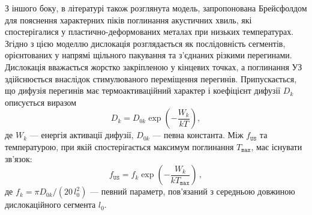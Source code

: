 З іншого боку, в літературі \cite{Brailsford} також розглянута модель, запропонована Брейсфолдом для пояснення характерних піків поглинання акустичних хвиль, які спостерігалися у пластично-деформованих металах при низьких температурах.
Згідно з цією моделлю дислокація розглядається як послідовність сегментів, орієнтованих у напрямі щільного пакування та з'єднаних різкими перегинами.
Дислокація вважається жорстко закріпленою у кінцевих точках, а поглинання УЗ здійснюється внаслідок стимулюваного переміщення перегинів.
Припускається, що дифузія перегинів має термоактиваційний характер і коефіцієнт дифузії $D_k$ описується виразом
\begin{equation}\label{eqDkink}
  D_k = D_{0k} \exp\left(-\frac{W_k}{kT}\right),
\end{equation}
де $W_k$ --- енергія активації дифузії,
$D_{0k}$ --- певна константа.
 Між $f_\mathtt{US}$ та температурою, при якій спостерігається максимум поглинання $T_\mathtt{max}$, має існувати зв'язок:
\begin{equation}
\label{eqfk}
f_\mathtt{US}=f_k\exp\left(-\frac{W_k}{kT_\mathtt{max}}\right)\,,
\end{equation}
де
$f_k=\pi D_{0k}/(20 \,l_0^2)$ --- певний параметр, пов'язаний з середньою довжиною дислокаційного сегмента $l_0$.

